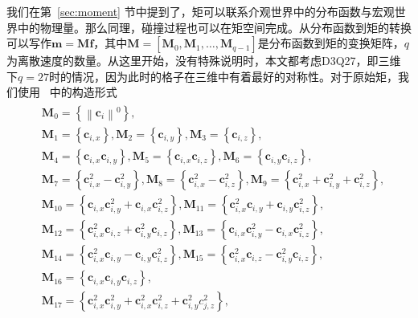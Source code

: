 我们在第~\ref{sec:moment} 节中提到了，矩可以联系介观世界中的分布函数与宏观世界中的物理量。那么同理，碰撞过程也可以在矩空间完成。从分布函数到矩的转换可以写作$\mathbf{m}=\mathbf{M}\mathbf{f}$，其中$\mathbf{M}=[\mathbf{M}_0, \mathbf{M}_1, \dots, \mathbf{M}_{q-1}]$是分布函数到矩的变换矩阵，$q$为离散速度的数量。从这里开始，没有特殊说明时，本文都考虑D3Q27，即三维下$q=27$时的情况，因为此时的格子在三维中有着最好的对称性。对于原始矩，我们使用~\cite{PhysRevE.95.013310} 中的构造形式
\begin{align}
\begin{split}
    & \boldsymbol{M}_0=\left\{\left\|\boldsymbol{c}_i\right\|^0\right\}, \\
    & \boldsymbol{M}_1=\left\{\boldsymbol{c}_{i, x}\right\}, \boldsymbol{M}_2=\left\{\boldsymbol{c}_{i, y}\right\}, \boldsymbol{M}_3=\left\{\boldsymbol{c}_{i, z}\right\}, \\
    & \boldsymbol{M}_4=\left\{\boldsymbol{c}_{i, x} \boldsymbol{c}_{i, y}\right\}, \boldsymbol{M}_5=\left\{\boldsymbol{c}_{i, x} \boldsymbol{c}_{i, z}\right\}, \boldsymbol{M}_6=\left\{\boldsymbol{c}_{i, y} \boldsymbol{c}_{i, z}\right\}, \\
    & \boldsymbol{M}_7=\left\{\boldsymbol{c}_{i, x}^2-\boldsymbol{c}_{i, y}^2\right\}, \boldsymbol{M}_8=\left\{\boldsymbol{c}_{i, x}^2-\boldsymbol{c}_{i, z}^2\right\}, \boldsymbol{M}_9=\left\{\boldsymbol{c}_{i, x}^2+\boldsymbol{c}_{i, y}^2+\boldsymbol{c}_{i, z}^2\right\}, \\
    & \boldsymbol{M}_{10}=\left\{\boldsymbol{c}_{i, x} \boldsymbol{c}_{i, y}^2+\boldsymbol{c}_{i, x} \boldsymbol{c}_{i, z}^2\right\}, \boldsymbol{M}_{11}=\left\{\boldsymbol{c}_{i, x}^2 \boldsymbol{c}_{i, y}+\boldsymbol{c}_{i, y} \boldsymbol{c}_{i, z}^2\right\}, \\
    & \boldsymbol{M}_{12}=\left\{\boldsymbol{c}_{i, x}^2 \boldsymbol{c}_{i, z}+\boldsymbol{c}_{i, y}^2 \boldsymbol{c}_{i, z}\right\}, \boldsymbol{M}_{13}=\left\{\boldsymbol{c}_{i, x} \boldsymbol{c}_{i, y}^2-\boldsymbol{c}_{i, x} \boldsymbol{c}_{i, z}^2\right\}, \\
    & \boldsymbol{M}_{14}=\left\{\boldsymbol{c}_{i, x}^2 \boldsymbol{c}_{i, y}-\boldsymbol{c}_{i, y} \boldsymbol{c}_{i, z}^2\right\}, \boldsymbol{M}_{15}=\left\{\boldsymbol{c}_{i, x}^2 \boldsymbol{c}_{i, z}-\boldsymbol{c}_{i, y}^2 \boldsymbol{c}_{i, z}\right\}, \\
    & \boldsymbol{M}_{16}=\left\{\boldsymbol{c}_{i, x} \boldsymbol{c}_{i, y} \boldsymbol{c}_{i, z}\right\}, \\
    & \boldsymbol{M}_{17}=\left\{\boldsymbol{c}_{i, x}^2 \boldsymbol{c}_{i, y}^2+\boldsymbol{c}_{i, x}^2 \boldsymbol{c}_{i, z}^2+\boldsymbol{c}_{i, y}^2 c_{j, z}^2\right\}, \\

\end{split}
\end{align}
